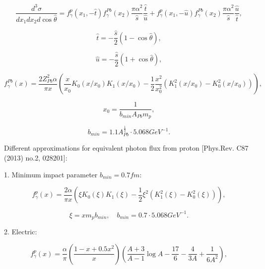 \begin{equation}
\frac{d^3\sigma}{dx_1dx_2d\cos{\hat{\theta}}} = f_\gamma^{p}(x_1,-\hat{t}) f_\gamma^{Pb}(x_2) \frac{\pi\alpha^2}{\hat{s}} \frac{\hat{t}}{\hat{u}}
+ f_\gamma^{p}(x_1,-\hat{u}) f_\gamma^{Pb}(x_2) \frac{\pi\alpha^2}{\hat{s}} \frac{\hat{u}}{\hat{t}},
\nonumber
\end{equation}

\begin{equation}
\hat{t} = -\frac{\hat{s}}{2}\left(1-\cos{\hat{\theta}}\right),
\nonumber
\end{equation}

\begin{equation}
\hat{u} = -\frac{\hat{s}}{2}\left(1+\cos{\hat{\theta}}\right),
\nonumber
\end{equation}

\begin{equation}
f_\gamma^{Pb}(x) = \frac{2Z_{Pb}^2\alpha}{\pi x}
\left(
\frac{x}{x_0}K_0(x/x_0)K_1(x/x_0)-\frac{1}{2}\frac{x^2}{x_0^2}
     \left(
      K_1^2(x/x_0)-K_0^2(x/x_0)
     \right)
\right),
\nonumber
\end{equation}

\begin{equation}
x_0 = \frac{1}{b_{min}A_{Pb}m_p},
\nonumber
\end{equation}

\begin{equation}
b_{min} = 1.1A_{Pb}^{\frac{1}{3}} \cdot 5.068 GeV^{-1}.
\nonumber
\end{equation}


Different approximations for equivalent photon flux from proton  [Phys.Rev. C87 (2013) no.2, 028201]:

1. Minimum impact parameter $b_{min} = 0.7fm$:

\begin{equation}
f_\gamma^{p}(x) = \frac{2\alpha}{\pi x}
\left(
\xi K_0(\xi)K_1(\xi)-\frac{1}{2}\xi^2
     \left(
      K_1^2(\xi)-K_0^2(\xi)
     \right)
\right),
\nonumber
\end{equation}

\begin{equation}
\xi = x m_p b_{min}, \quad b_{min} = 0.7 \cdot 5.068 GeV^{-1}.
\nonumber
\end{equation}

2. Electric:

\begin{equation}
f_\gamma^{p}(x) = \frac{\alpha}{\pi}
\left(
\frac{1-x+0.5x^2}{x}
\right)
\left(
\frac{A+3}{A-1}\log{A}-\frac{17}{6}-\frac{4}{3A}+\frac{1}{6A^2}
\right),
\nonumber
\end{equation}

